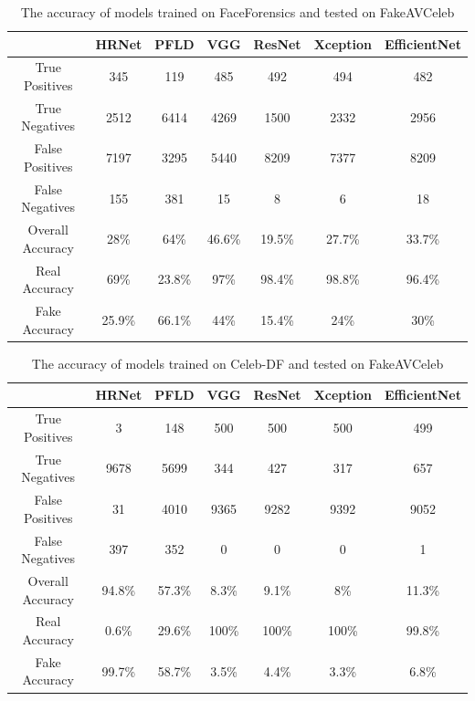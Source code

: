 \begin{table}[H]
    \centering
    \begin{tabular}{|c|c|c|c|c|c|c|}
        \hline
        \textbf{} & \textbf{HRNet} & \textbf{PFLD} & \textbf{VGG} & \textbf{ResNet} & \textbf{Xception} & \textbf{EfficientNet} \\
        \hline
        True Positives & 345 & 119 & 485 & 492 & 494 & 482\\
        \hline
        True Negatives & 2512 & 6414 & 4269 & 1500 & 2332 & 2956\\
        \hline
        False Positives & 7197 & 3295 & 5440 & 8209 & 7377 & 8209\\
        \hline
        False Negatives & 155 & 381 & 15 & 8 & 6 & 18\\
        \hline
        Overall Accuracy & 28\% & 64\% & 46.6\% & 19.5\% & 27.7\% & 33.7\% \\
        \hline
        Real Accuracy & 69\% & 23.8\% & 97\% & 98.4\% & 98.8\% & 96.4\% \\
        \hline
        Fake Accuracy & 25.9\% & 66.1\% & 44\% & 15.4\% & 24\% & 30\% \\
        \hline
    \end{tabular}
    \caption{The accuracy of models trained on FaceForensics and tested on FakeAVCeleb}
\end{table}

\begin{table}[H]
    \centering
    \begin{tabular}{|c|c|c|c|c|c|c|}
        \hline
        \textbf{} & \textbf{HRNet} & \textbf{PFLD} & \textbf{VGG} & \textbf{ResNet} & \textbf{Xception} & \textbf{EfficientNet} \\
        \hline
        True Positives & 3 & 148 & 500 & 500 & 500 & 499\\
        \hline
        True Negatives & 9678 & 5699 & 344 & 427 & 317 & 657\\
        \hline
        False Positives & 31 & 4010 & 9365 & 9282 & 9392 & 9052\\
        \hline
        False Negatives & 397 & 352 & 0 & 0 & 0 & 1\\
        \hline
        Overall Accuracy & 94.8\% & 57.3\% & 8.3\% & 9.1\% & 8\% & 11.3\% \\
        \hline
        Real Accuracy & 0.6\% & 29.6\% & 100\% & 100\% & 100\% & 99.8\% \\
        \hline
        Fake Accuracy & 99.7\% & 58.7\% & 3.5\% & 4.4\% & 3.3\% & 6.8\% \\
        \hline
    \end{tabular}
    \caption{The accuracy of models trained on Celeb-DF and tested on FakeAVCeleb}
\end{table}


